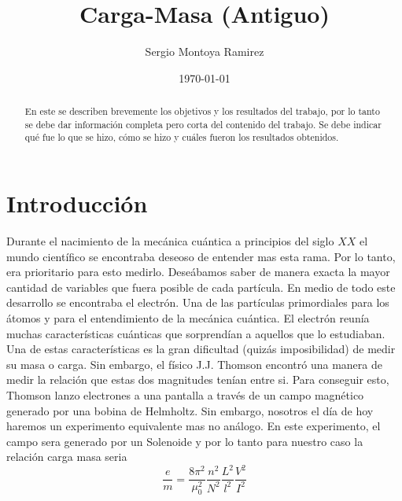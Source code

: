 \documentclass[a4paper, amsfonts, amssymb, amsmath, reprint, showkeys, nofootinbib, twoside]{revtex4-1}
\begin{document}
\title{Carga-Masa (Antiguo)}


\author{Sergio Montoya Ramirez}

  


\date{\today} %

\begin{abstract}

En este se describen brevemente los objetivos y los resultados del trabajo, por lo tanto se debe dar información completa pero corta del contenido del trabajo. Se debe indicar qué fue lo que se hizo, cómo se hizo y cuáles fueron los resultados obtenidos.

\end{abstract}

\maketitle

\section{Introducción}

Durante el nacimiento de la mecánica cuántica a principios del siglo $XX$ el mundo científico se encontraba deseoso de entender mas esta rama. Por lo tanto, era prioritario para esto medirlo. Deseábamos saber de manera exacta la mayor cantidad de variables que fuera posible de cada partícula. En medio de todo este desarrollo se encontraba el electrón. Una de las partículas primordiales para los átomos y para el entendimiento de la mecánica cuántica. El electrón reunía muchas características cuánticas que sorprendían a aquellos que lo estudiaban. Una de estas características es la gran dificultad (quizás imposibilidad) de medir su masa o carga. Sin embargo, el físico J.J. Thomson encontró una manera de medir la relación que estas dos magnitudes tenían entre si. Para conseguir esto, Thomson lanzo electrones a una pantalla a través de un campo magnético generado por una bobina de Helmholtz. Sin embargo, nosotros el día de hoy haremos un experimento equivalente mas no análogo. En este experimento, el campo sera generado por un Solenoide y por lo tanto para nuestro caso la relación carga masa seria
\begin{equation}
  \label{eq:CargaMasa}
  \frac{e}{m}=\frac{8\pi^2}{\mu_0^2}\frac{n^2}{N^2}\frac{L^2}{l^2}\frac{V^2}{I^2}
\end{equation}
\end{document}
